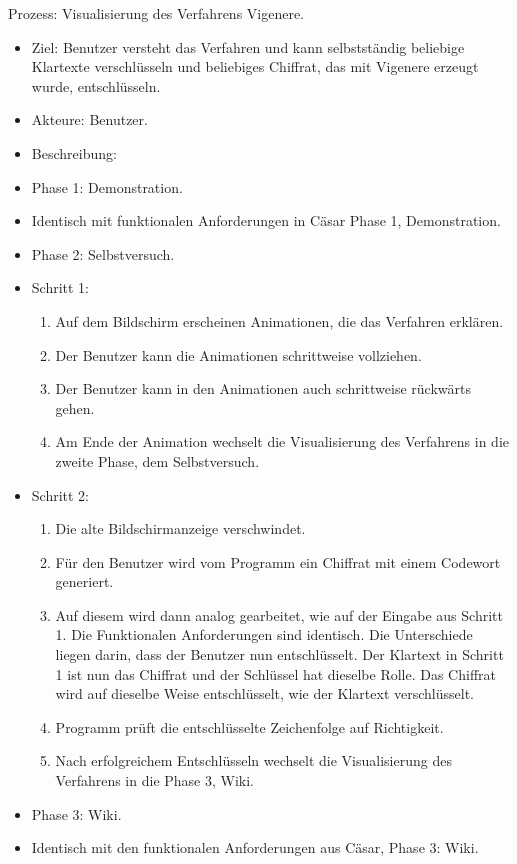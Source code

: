 \documentclass{article}
\begin{document}
\begin{FA}[start=120]
 \item Prozess: Visualisierung des Verfahrens Vigenere.
\end{FA}
\begin{itemize}[label={}]
 \item Ziel: Benutzer versteht das Verfahren und kann selbstständig beliebige Klartexte verschlüsseln 
und beliebiges Chiffrat, das mit Vigenere erzeugt wurde, entschlüsseln.
 \item Akteure: Benutzer.
 \item Beschreibung:
 \item Phase 1: Demonstration.
 \item Identisch mit funktionalen Anforderungen in Cäsar Phase 1, Demonstration. 
 \item Phase 2: Selbstversuch.
 \item Schritt 1:
 \begin{enumerate}
  \item Auf dem Bildschirm erscheinen Animationen, die das Verfahren erklären.
  \item Der Benutzer kann die Animationen schrittweise vollziehen.
  \item Der Benutzer kann in den Animationen auch schrittweise rückwärts gehen. 
  \item Am Ende der Animation wechselt die Visualisierung des Verfahrens in die zweite Phase, dem Selbstversuch.
 \end{enumerate}
 \item Schritt 2:
 \begin{enumerate}
  \item Die alte Bildschirmanzeige verschwindet.
  \item Für den Benutzer wird vom Programm ein Chiffrat mit einem Codewort generiert. 
  \item[] Auf diesem wird dann analog gearbeitet, wie auf der Eingabe aus Schritt 1. Die Funktionalen Anforderungen sind identisch.
        Die Unterschiede liegen darin, dass der Benutzer nun entschlüsselt. 
        Der Klartext in Schritt 1 ist nun das Chiffrat und der Schlüssel hat dieselbe Rolle.
        Das Chiffrat wird auf dieselbe Weise entschlüsselt, wie der Klartext verschlüsselt. 
  \item Programm prüft die entschlüsselte Zeichenfolge auf Richtigkeit.
  \item Nach erfolgreichem Entschlüsseln wechselt die Visualisierung des Verfahrens in die Phase 3, Wiki.
 \end{enumerate}
 \item Phase 3: Wiki.
 \item Identisch mit den funktionalen Anforderungen aus Cäsar, Phase 3: Wiki.
\end{itemize}
\end{document}
